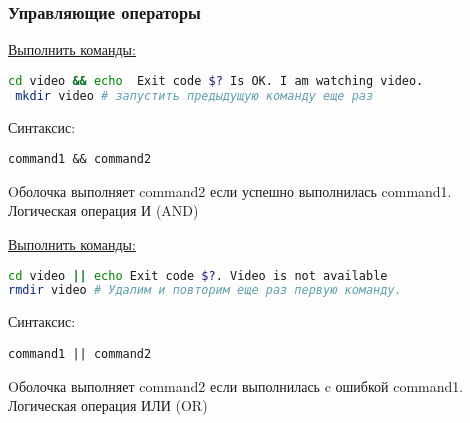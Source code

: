 \begin{frame}[fragile]
\frametitle{Управляющие операторы}

\underline{Выполнить команды:}
\begin{lstlisting}[language=bash]
 cd video && echo  Exit code $? Is OK. I am watching video.
 mkdir video # запустить предыдущую команду еще раз
\end{lstlisting}

\pause

Синтаксис:
\begin{verbatim}
command1 && command2
\end{verbatim}
Oболочка выполняет command2 если \alert{успешно} выполнилась command1. Логическая операция И (AND)
\pause

\underline{Выполнить команды:}
\pause
\begin{lstlisting}[language=bash]
cd video || echo Exit code $?. Video is not available 
rmdir video # Удалим и повторим еще раз первую команду.
\end{lstlisting}

\pause

Синтаксис:
\begin{verbatim}
command1 || command2
\end{verbatim}
Oболочка выполняет command2 если выполнилась c \alert{ошибкой} command1. Логическая операция ИЛИ (OR)
\end{frame}

